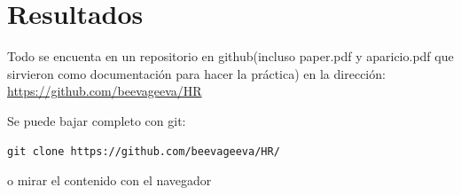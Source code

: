 \documentclass[10pt]{book}
\begin{document}
\section*{Resultados}
Todo se encuenta en un repositorio en github(incluso paper.pdf y aparicio.pdf que sirvieron como documentación para hacer la práctica) en la dirección: \url{https://github.com/beevageeva/HR}

Se puede bajar completo con git:
\begin{verbatim}
git clone https://github.com/beevageeva/HR/  
\end{verbatim}
o mirar el contenido con el navegador








 
\end{document}
